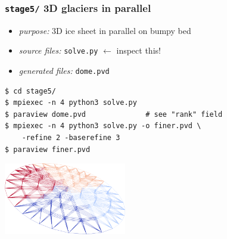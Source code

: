 \documentclass[10pt,
               hyperref={colorlinks,citecolor=DeepPink4,linkcolor=black,urlcolor=blue},
               svgnames]{beamer}
\begin{document}
\begin{frame}[fragile]
\frametitle{\texttt{stage5/} \qquad 3D glaciers in parallel}

\begin{itemize}
\item \emph{purpose:} 3D ice sheet in parallel on bumpy bed
\item \emph{source files:} \texttt{solve.py} \hfill \alert{$\gets$ inspect this!}
\item \emph{generated files:} \texttt{dome.pvd}
\end{itemize}

\bigskip
\begin{Verbatim}
$ cd stage5/
$ mpiexec -n 4 python3 solve.py
$ paraview dome.pvd              # see "rank" field
$ mpiexec -n 4 python3 solve.py -o finer.pvd \
    -refine 2 -baserefine 3
$ paraview finer.pvd
\end{Verbatim}

\bigskip
\begin{center}
\includegraphics[width=0.4\textwidth]{figs/stage5.png}
\end{center}
\end{frame}
\end{document}
